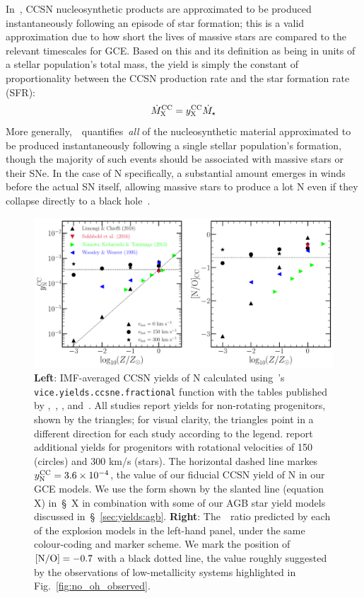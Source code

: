\documentclass[ms.tex]{subfiles}
\begin{document}
In~\vice, CCSN nucleosynthetic products are approximated to be produced
instantaneously following an episode of star formation; this is a valid
approximation due to how short the lives of massive stars are compared to the
relevant timescales for GCE.
Based on this and its definition as being in units of a stellar population's
total mass, the yield is simply the constant of proportionality between the
CCSN production rate and the star formation rate (SFR):
\begin{equation}
\dot{M}_\text{X}^\text{CC} = y_\text{X}^\text{CC}\dot{M}_\star
\end{equation}
More generally,~~quantifies~\textit{all} of the nucleosynthetic material
approximated to be produced instantaneously following a single stellar
population's formation, though the majority of such events should be associated
with massive stars or their SNe.
In the case of N specifically, a substantial amount emerges in winds before the
actual SN itself, allowing massive stars to produce a lot N even if they
collapse directly to a black hole~\citep{Griffith2021a}.

\begin{figure}
\centering
\includegraphics[scale = 0.45]{n_cc_yields.pdf}
\caption{
\textbf{Left}: IMF-averaged CCSN yields of N calculated using~\vice's
\texttt{vice.yields.ccsne.fractional} function with the tables published by
\citet[][blue]{Woosley1995},~\citet[][green]{Nomoto2013},
\citet[][red]{Sukhbold2016}, and~\citet[][black]{Limongi2018}.
All studies report yields for non-rotating progenitors, shown by the triangles;
for visual clarity, the triangles point in a different direction for each study
according to the legend.
\citet{Limongi2018} report additional yields for progenitors with rotational
velocities of 150 (circles) and 300 km/s (stars).
The horizontal dashed line markes~$y_\text{N}^\text{CC} = 3.6\times10^{-4}$,
the value of our fiducial CCSN yield of N in our GCE models.
We use the form shown by the slanted line (equation X) in~\S~X in combination
with some of our AGB star yield models discussed in~\S~\ref{sec:yields:agb}.
\textbf{Right}: The~\no~ratio predicted by each of the explosion models in
the left-hand panel, under the same colour-coding and marker scheme.
We mark the position of~$\text{[N/O]} = -0.7$ with a black dotted line, the value
roughly suggested by the observations of low-metallicity systems highlighted
in Fig.~\ref{fig:no_oh_observed}.
}
\label{fig:n_cc_yields}
\end{figure}
\end{document}
